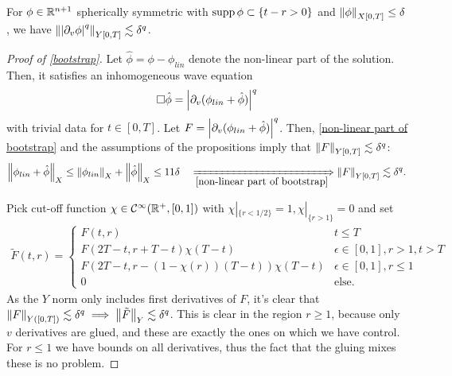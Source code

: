 \documentclass[11pt, oneside]{amsart}
\begin{document}
	\begin{lemma}\label{non-linear part of bootstrap}
		For $\phi\in\mathbb{R}^{n+1}$ spherically symmetric with $\operatorname{supp}\phi\subset\{t-r>0\}$ and $\left\lVert \phi\right\rVert_{X[0,T]}\leq\delta$, we have $\left\lVert \left\lvert \partial_v\phi\right\rvert^q\right\rVert_{Y[0,T]}\lesssim \delta^q$.
	\end{lemma}
	
	\begin{proof}[Proof of \cref{bootstrap}]
		Let $\hat{\phi}=\phi-\phi_{lin}$ denote the non-linear part of the solution. Then, it satisfies an inhomogeneous wave equation
		\begin{equation*}
			\begin{gathered}
				\Box\hat{\phi}=\left\lvert \partial_v(\phi_{lin}+\hat{\phi})\right\rvert^q
			\end{gathered}
		\end{equation*}
		with trivial data for $t\in[0,T]$. Let $F=\left\lvert \partial_v(\phi_{lin}+\hat{\phi})\right\rvert^q$. Then, \cref{non-linear part of bootstrap} and the assumptions of the propositions imply that $\left\lVert F\right\rVert_{Y[0,T]}\lesssim\delta^q$: 
		\begin{equation*}
			\begin{gathered}
				\norm{\phi_{lin}+\hat{\phi}}_X\leq\norm{\phi_{lin}}_X+\norm{\hat{\phi}}_X\leq 11\delta\quad\xRightarrow[\cref{non-linear part of bootstrap}]\quad \norm{F}_{Y[0,T]}\lesssim \delta^q.
			\end{gathered}
		\end{equation*}
		
		Pick cut-off function $\chi\in\mathcal{C}^\infty(\mathbb{R}^+,[0,1])$ with $\chi|_{\{r<1/2\}}=1, \chi|_{\{r>1\}}=0$ and set
		\begin{equation}\label{F extension}
			\begin{gathered}
				\tilde{F}(t,r)=\begin{cases}
					F(t,r) & t\leq T\\
					F(2T-t,r+T-t)\chi(T-t) & \epsilon\in[0,1],r>1,t>T\\
					F(2T-t,r-(1-\chi(r))(T-t))\chi(T-t) & \epsilon\in[0,1],r\leq1\\
					0 & \text{else}.
				\end{cases}
			\end{gathered}
		\end{equation}
		As the $Y$ norm only includes first derivatives of $F$, it's clear that $\left\lVert F\right\rVert_{Y([0,T])}\lesssim\delta^q\implies\left\lVert \tilde{F}\right\rVert_{Y}\lesssim\delta^q$. This is clear in the region $r\geq1$, because only $v$ derivatives are glued, and these are exactly the ones on which we have control. For $r\leq1$ we have bounds on all derivatives, thus the fact that the gluing mixes these is no problem. 
		

\end{proof}
\end{document}
